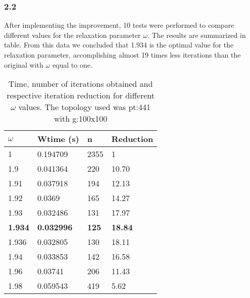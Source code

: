 \subsubsection*{2.2}
After implementing the improvement, 10 tests were performed to compare different values for the relaxation parameter $\omega$. The results are summarized in table. From this data we concluded that 1.934 is the optimal value for the relaxation parameter, accomplishing almost 19 times less iterations than the original with $\omega$ equal to one.
\begin{table*}[h]
\centering
\begin{tabular}{llll}
  \hline
  $\omega$ & Wtime (s) & n    & Reduction   \\
  \hline
  1     & 0.194709  & 2355 & 1           \\
  1.9   & 0.041364  & 220  & 10.70 \\
  1.91  & 0.037918  & 194  & 12.13 \\
  1.92  & 0.0369    & 165  & 14.27 \\
  1.93  & 0.032486  & 131  & 17.97 \\
  \textbf{1.934} & \textbf{0.032996}  & \textbf{125} & \textbf{18.84}  \\
  1.936 & 0.032805  & 130  & 18.11 \\
  1.94  & 0.033853  & 142  & 16.58 \\
  1.96  & 0.03741   & 206  & 11.43 \\
  1.98  & 0.059543  & 419  & 5.62
\end{tabular}
\caption{Time, number of iterations obtained and respective iteration reduction for different $\omega$ values. The topology used was pt:441 with g:100x100}
\label{tab:omega}
\end{table*}

